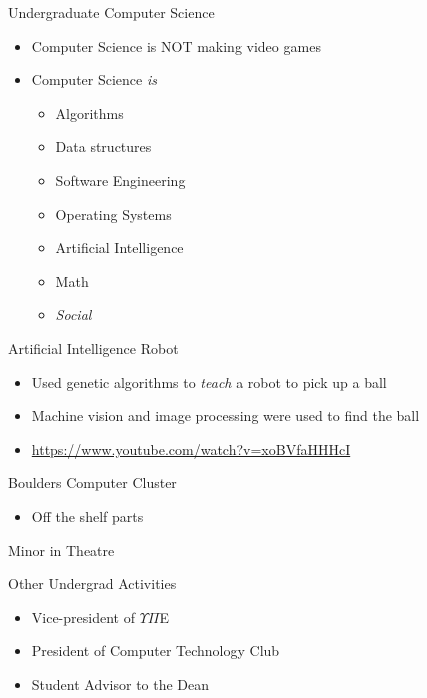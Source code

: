 \documentclass{beamer}
\begin{document}
\begin{frame}{Undergraduate Computer Science}
\begin{itemize}
	\item Computer Science is NOT making video games
	\item Computer Science \emph{is}
	\begin{itemize}
		\item Algorithms
		\item Data structures
		\item Software Engineering
		\item Operating Systems
		\item Artificial Intelligence
		\item Math
		\item \emph{Social}
	\end{itemize}
\end{itemize}
\end{frame}

\begin{frame}{Artificial Intelligence Robot}
\begin{itemize}
	\item Used genetic algorithms to \emph{teach} a robot to pick up a ball
	\item Machine vision and image processing were used to find the ball
	\item \url{https://www.youtube.com/watch?v=xoBVfaHHHcI}
\end{itemize}
\end{frame}

\begin{frame}{Boulders Computer Cluster}
\begin{itemize}
	\item Off the shelf parts
\end{itemize}
\end{frame}

\begin{frame}{Minor in Theatre}

\end{frame}

\begin{frame}{Other Undergrad Activities}
\begin{itemize}
	\item Vice-president of $\Upsilon\Pi$E
	\item President of Computer Technology Club
	\item Student Advisor to the Dean
\end{itemize}
\end{frame}
\end{document}
